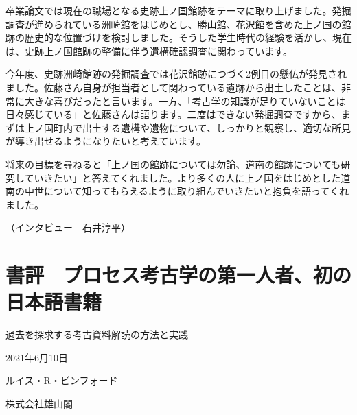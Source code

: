 \documentclass[a4j,11pt,twocolumn,openany]{jsbook}
\begin{document}
卒業論文では現在の職場となる史跡上ノ国館跡をテーマに取り上げました。発掘調査が進められている洲崎館をはじめとし、勝山館、花沢館を含めた上ノ国の館跡の歴史的な位置づけを検討しました。そうした学生時代の経験を活かし、現在は、史跡上ノ国館跡の整備に伴う遺構確認調査に関わっています。

今年度、史跡洲崎館跡の発掘調査では花沢館跡につづく2例目の懸仏が発見されました。佐藤さん自身が担当者として関わっている遺跡から出土したことは、非常に大きな喜びだったと言います。一方、「考古学の知識が足りていないことは日々感じている」と佐藤さんは語ります。二度はできない発掘調査ですから、まずは上ノ国町内で出土する遺構や遺物について、しっかりと観察し、適切な所見が導き出せるようになりたいと考えています。

将来の目標を尋ねると「上ノ国の館跡については勿論、道南の館跡についても研究していきたい」と答えてくれました。より多くの人に上ノ国をはじめとした道南の中世について知ってもらえるように取り組んでいきたいと抱負を語ってくれました。　

\hspace{8zw}（インタビュー　石井淳平）

\chapter{書評　プロセス考古学の第一人者、初の日本語書籍}

\begin{description}	[leftmargin=3.5zw] %
	\item[書　名]過去を探求する考古資料解読の方法と実践
	\item[刊　行]2021年6月10日
	\item[編著者]ルイス・R・ビンフォード
	\item[発　行]株式会社雄山閣
\end{description}
\end{document}

